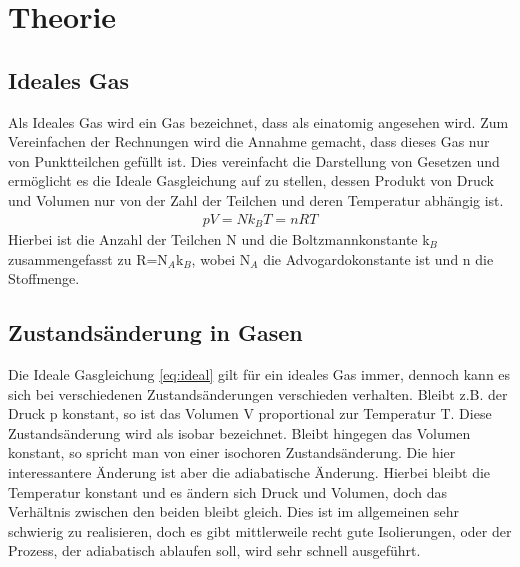 \documentclass[12pt,a4paper,titlepage,headinclude,bibtotoc]{scrartcl}
\begin{document}
\section{Theorie}
\label{sec:theorie}

\subsection{Ideales Gas}
Als Ideales Gas wird ein Gas bezeichnet, dass als einatomig angesehen wird.
Zum Vereinfachen der Rechnungen wird die Annahme gemacht, dass dieses Gas nur von Punktteilchen gefüllt ist.
Dies vereinfacht die Darstellung von Gesetzen und ermöglicht es die Ideale Gasgleichung auf zu stellen, dessen Produkt von Druck und Volumen nur von der Zahl der Teilchen und deren Temperatur abhängig ist.
\begin{align}
	pV=Nk_BT=nRT\label{eq:ideal}
\end{align}
Hierbei ist die Anzahl der Teilchen N und die Boltzmannkonstante k$_B$ zusammengefasst zu R=N$_A$k$_B$, wobei N$_A$ die Advogardokonstante ist und n die Stoffmenge.
\cite[S. 261]{gerthsen}

\subsection{Zustandsänderung in Gasen}
Die Ideale Gasgleichung \eqref{eq:ideal} gilt für ein ideales Gas immer, dennoch kann es sich bei verschiedenen Zustandsänderungen verschieden verhalten.
Bleibt z.B.  der Druck p konstant, so ist das Volumen V proportional zur Temperatur T.
Diese Zustandsänderung wird als isobar bezeichnet.
Bleibt hingegen das Volumen konstant, so spricht man von einer isochoren Zustandsänderung.
Die hier interessantere Änderung ist aber die adiabatische Änderung.
Hierbei bleibt die Temperatur konstant und es ändern sich Druck und Volumen, doch das Verhältnis %
zwischen den beiden bleibt gleich.
Dies ist im allgemeinen sehr schwierig zu realisieren, doch es gibt mittlerweile recht gute Isolierungen, oder der Prozess, der adiabatisch ablaufen soll, wird sehr schnell ausgeführt.
\end{document}
